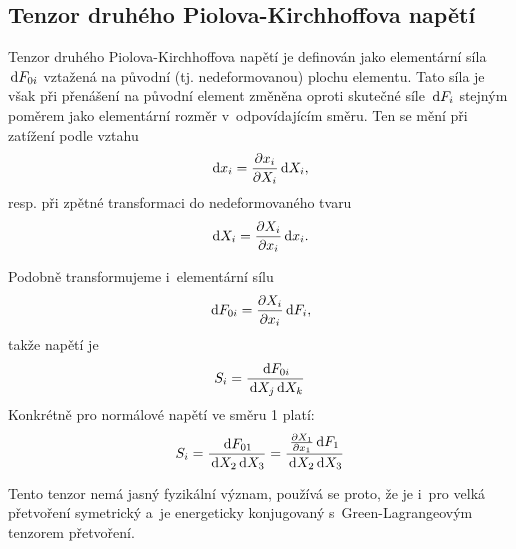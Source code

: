 
\subsection{Tenzor druhého Piolova-Kirchhoffova napětí}
Tenzor druhého Piolova-Kirchhoffova napětí je definován jako elementární síla $\,\mathrm{d} F_{0i}$ vztažená na původní (tj. nedeformovanou) plochu elementu. Tato síla je však při přenášení na původní element změněna oproti skutečné síle $\,\mathrm{d} F_i$ stejným poměrem jako elementární rozměr v~odpovídajícím směru. Ten se mění při zatížení podle vztahu
\begin{equation}
	\,\mathrm{d} x_i = \frac{\partial x_i}{\partial X_i} \,\mathrm{d} X_i,
\end{equation}
resp. při zpětné transformaci do nedeformovaného tvaru
\begin{equation}
	\,\mathrm{d} X_i = \frac{\partial X_i}{\partial x_i} \,\mathrm{d} x_i.
\end{equation}

Podobně transformujeme i~elementární sílu
\begin{equation}
	\,\mathrm{d} F_{0i} = \frac{\partial X_i}{\partial x_i} \,\mathrm{d} F_i,
\end{equation}
takže  napětí je
\begin{equation}
	S_i = \frac{\,\mathrm{d} F_{0i}}{\,\mathrm{d} X_j \,\mathrm{d} X_k}
\end{equation}
Konkrétně pro normálové napětí ve směru 1 platí:
\begin{equation}
	S_i = \frac{\,\mathrm{d} F_{01}}{\,\mathrm{d} X_2 \,\mathrm{d} X_3}
	= \frac{\frac{\partial X_1}{\partial x_1} \,\mathrm{d} F_1}{\,\mathrm{d} X_2 \,\mathrm{d} X_3}
\end{equation}

Tento tenzor nemá jasný fyzikální význam, používá se proto, že je i~pro velká přetvoření symetrický a~je energeticky konjugovaný s~Green-Lagrangeovým tenzorem přetvoření.
